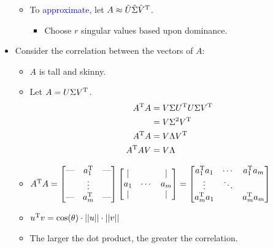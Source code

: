 \documentclass{article}
\begin{document}
\begin{itemize}
\begin{itemize}
        \item To \textcolor{blue}{approximate}, let $A\approx \tilde{U}\tilde{\Sigma}\tilde{V}^{\text{T}}$.
        \begin{itemize}
            \item Choose $r$ singular values based upon dominance.
        \end{itemize}
    \end{itemize}
    \item Consider the correlation between the vectors of $A$:
    \begin{itemize}
        \item $A$ is tall and skinny.
        \item Let $A = U\Sigma V^{\text{T}}$.
        \begin{align*}
            A^{\text{T}} A &= V\Sigma U^{\text{T}} U\Sigma V^{\text{T}}\\
            &= V\Sigma^2V^{\text{T}}\\
            A^{\text{T}} A &= V\Lambda V^{\text{T}}\\
            A^{\text{T}} AV &= V\Lambda
        \end{align*}
        \item $
            A^{\text{T}} A =
            \begin{bmatrix}
                \text{---} & a_1^{\text{T}} & \text{---}\\
                 & \vdots & \\
                \text{---} & a_m^{\text{T}} & \text{---}\\
            \end{bmatrix}
            \begin{bmatrix}
                | &  & |\\
                a_1 & \cdots & a_m\\
                | &  & |\\
            \end{bmatrix}
            =
            \begin{bmatrix}
                a_1^{\text{T}} a_1 & \cdots & a_1^{\text{T}} a_m\\
                \vdots & \ddots & \\
                a_m^{\text{T}} a_1 &  & a_m^{\text{T}} a_m\\
            \end{bmatrix}
        $
        \item $u^{\text{T}} v = \cos(\theta)\cdot||u||\cdot||v||$
        \item The larger the dot product, the greater the correlation.
        \begin{figure}[H]
            \centering
            \begin{subfigure}[b]{0.3\linewidth}
                \centering
\end{subfigure}
\end{figure}
\end{itemize}
\end{itemize}
\end{document}
